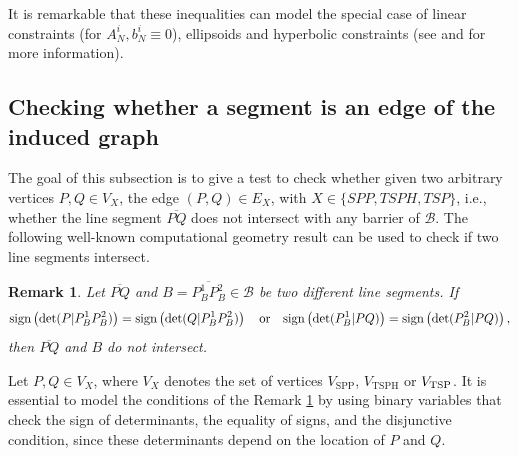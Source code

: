 \documentclass[a4paper,  review, authoryear, 1p.]{elsarticle}
\newcommand{\VSPP}{{V_{\text{SPP}}}}
\newcommand{\VTSPH}{{V_{\text{TSPH}}}}
\newtheorem{remark}{Remark}
\newcommand{\determinant}[3]{\det({#1|#2#3})}
\begin{document}
		It is remarkable that these inequalities can model the special case of linear constraints (for $A_N^{i}, b_N^i\equiv 0$), ellipsoids and hyperbolic constraints (see \citet{lobo_applications_1998} and \citet{boyd_convex_2004} for more information).
		
		
		\subsection{Checking whether a segment is an edge of the induced graph}
		
		The goal of this subsection is to give a test to check whether given two arbitrary vertices $P, Q\in V_X$, the edge $(P, Q)\in E_X$, with $X\in\{SPP, TSPH, TSP\}$, i.e., whether the line segment $\overline{PQ}$ does not intersect with any barrier of $\mathcal B$. The following well-known computational geometry result can be used to check if two line segments intersect.
		
		
		\begin{remark}\label{rem:determinants}
			Let $\overline{PQ}$ and $B=\overline{P_B^1P_B^2}\in\mathcal B$ be two different line segments. 
			If
			\begin{equation*}
				\normalfont{\text{sign}}\left(\determinant{P}{P_B^1}{P_B^2}\right) = \normalfont{\text{sign}}\left(\determinant{Q}{P_B^1}{P_B^2}\right)
				\quad
				\text{or}
				\quad
				\normalfont{\text{sign}}\left(\determinant{P_B^1}{P}{Q}\right) = \normalfont{\text{sign}}\left(\determinant{P_B^2}{P}{Q}\right)
				,
			\end{equation*}
			then $\overline{PQ}$ and $B$ do not intersect.
		\end{remark}
		
		
		
		
		Let $P,Q\in V_X$, where $V_X$ denotes the set of vertices $\VSPP$, $\VTSPH$ or $V_{\rm{TSP}}$. It is essential to model the conditions of the Remark \ref{rem:determinants} by using binary variables that check the sign of determinants, the equality of signs, and the disjunctive condition, since these determinants depend on the location of $P$ and $Q$.
		
\end{document}
